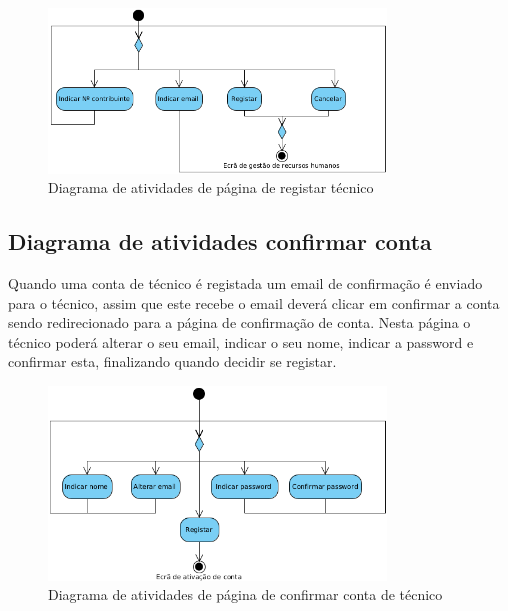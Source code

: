 \begin{figure}[htb]
    \centering
    \includegraphics[width=0.8\textwidth]{images/diagramas/atividades/diagrama_atividades_add_professional.png}
    \caption{Diagrama de atividades de página de registar técnico}
    \label{fig:31}
\end{figure}

\subsection{Diagrama de atividades confirmar conta}

Quando uma conta de técnico é registada um email de confirmação é enviado para o técnico, assim que este
recebe o email deverá clicar em confirmar a conta sendo redirecionado para a página de confirmação de conta.
Nesta página o técnico poderá alterar o seu email, indicar o seu nome, indicar a password e confirmar esta, 
finalizando quando decidir se registar.

\begin{figure}[htb]
    \centering
    \includegraphics[width=0.8\textwidth]{images/diagramas/atividades/diagrama_atividades_prof_register.png}
    \caption{Diagrama de atividades de página de confirmar conta de técnico}
    \label{fig:31}
\end{figure}